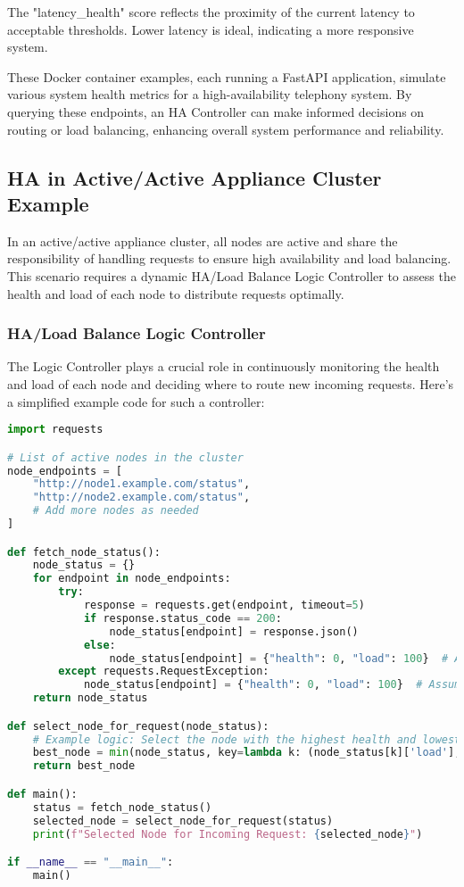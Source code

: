 \documentclass[12pt]{article}
\begin{document}
The "latency\_health" score reflects the proximity of the current latency to acceptable thresholds. Lower latency is ideal, indicating a more responsive system.

These Docker container examples, each running a FastAPI application, simulate various system health metrics for a high-availability telephony system. By querying these endpoints, an HA Controller can make informed decisions on routing or load balancing, enhancing overall system performance and reliability.


\subsection{HA in Active/Active Appliance Cluster Example}

In an active/active appliance cluster, all nodes are active and share the responsibility of handling requests to ensure high availability and load balancing. This scenario requires a dynamic HA/Load Balance Logic Controller to assess the health and load of each node to distribute requests optimally.

\subsubsection{HA/Load Balance Logic Controller}

The Logic Controller plays a crucial role in continuously monitoring the health and load of each node and deciding where to route new incoming requests. Here's a simplified example code for such a controller:

\begin{lstlisting}[language=Python, caption=HA/Load Balance Logic Controller]
import requests

# List of active nodes in the cluster
node_endpoints = [
    "http://node1.example.com/status",
    "http://node2.example.com/status",
    # Add more nodes as needed
]

def fetch_node_status():
    node_status = {}
    for endpoint in node_endpoints:
        try:
            response = requests.get(endpoint, timeout=5)
            if response.status_code == 200:
                node_status[endpoint] = response.json()
            else:
                node_status[endpoint] = {"health": 0, "load": 100}  # Assume max load and no health
        except requests.RequestException:
            node_status[endpoint] = {"health": 0, "load": 100}  # Assume max load and no health
    return node_status

def select_node_for_request(node_status):
    # Example logic: Select the node with the highest health and lowest load
    best_node = min(node_status, key=lambda k: (node_status[k]['load'], -node_status[k]['health']))
    return best_node

def main():
    status = fetch_node_status()
    selected_node = select_node_for_request(status)
    print(f"Selected Node for Incoming Request: {selected_node}")

if __name__ == "__main__":
    main()
\end{lstlisting}
\end{document}
